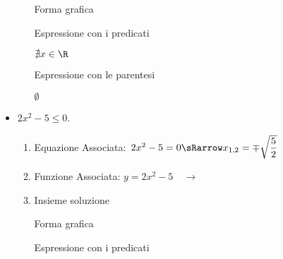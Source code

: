 \begin{esempio}
\begin{itemize}
\begin{enumerate}
  \begin{minipage}{.32\textwidth}
  Forma grafica\\[-.7em]
  
 \begin{center}
  \vspace{.4em}
 \end{center}
  \end{minipage}
  \begin{minipage}{.32\textwidth}
  Espressione con i predicati\\[-.3em]
  
 \begin{center}
  \(\nexists x \in \R\)
  \vspace{1em}
 \end{center}
  \end{minipage}
  \begin{minipage}{.32\textwidth}
  Espressione con le parentesi\\[-.3em]
  
 \begin{center}
  \(\emptyset\)
  \vspace{.8em}
 \end{center}
  \end{minipage}
\end{enumerate}

\item \(2x^2-5 \le 0\).

\begin{enumerate}
 \item
  Equazione Associata:~\(2x^2-5=0 \sRarrow 
                        x_{1, 2}= \mp \sqrt{\dfrac{5}{2}}\)
 \item 
  \begin{minipage}{.45\textwidth}
  Funzione Associata: \(y = 2x^2-5 \quad \rightarrow\)
  \end{minipage}
  \begin{minipage}{.30\textwidth}
  \end{minipage}
 \item 
 Insieme soluzione\\
 
  \begin{minipage}{.32\textwidth}
  Forma grafica\\[-.7em]
  
 \begin{center}
  \vspace{.4em}
 \end{center}
  \end{minipage}
  \begin{minipage}{.32\textwidth}
  Espressione con i predicati\\[-.3em]
  

\end{minipage}
\end{enumerate}
\end{itemize}
\end{esempio}
